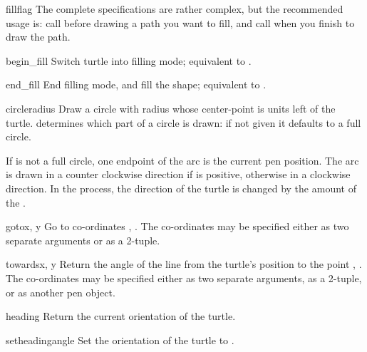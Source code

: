 \begin{funcdesc}{fill}{flag}
The complete specifications are rather complex, but the recommended 
usage is: call  before drawing a path you want to fill,
and call  when you finish to draw the path.
\end{funcdesc}

\begin{funcdesc}{begin\_fill}{}
Switch turtle into filling mode; equivalent to .
\end{funcdesc}

\begin{funcdesc}{end\_fill}{}
End filling mode, and fill the shape; equivalent to .
\end{funcdesc}

\begin{funcdesc}{circle}{radius}
Draw a circle with radius  whose center-point is
 units left of the turtle.
 determines which part of a circle is drawn: if
not given it defaults to a full circle.

If  is not a full circle, one endpoint of the arc is the
current pen position. The arc is drawn in a counter clockwise
direction if  is positive, otherwise in a clockwise
direction.  In the process, the direction of the turtle is changed
by the amount of the .
\end{funcdesc}

\begin{funcdesc}{goto}{x, y}
Go to co-ordinates , .  The co-ordinates may be
specified either as two separate arguments or as a 2-tuple.
\end{funcdesc}

\begin{funcdesc}{towards}{x, y}
Return the angle of the line from the turtle's position
to the point , . The co-ordinates may be
specified either as two separate arguments, as a 2-tuple,
or as another pen object.
\end{funcdesc}

\begin{funcdesc}{heading}{}
Return the current orientation of the turtle.
\end{funcdesc}

\begin{funcdesc}{setheading}{angle}
Set the orientation of the turtle to .
\end{funcdesc}

